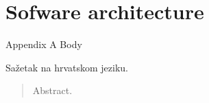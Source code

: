 \documentclass[times, utf8, zavrsni]{fer}
\begin{document}




\appendix
\chapter{Sofware architecture}
Appendix A Body


\begin{sazetak}
Sažetak na hrvatskom jeziku.

\end{sazetak}

\begin{abstract}
Abstract.

\end{abstract}
\end{document}
